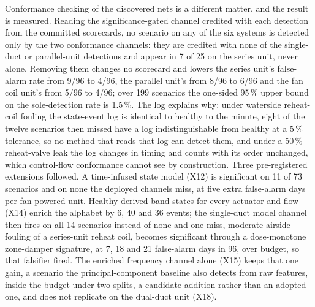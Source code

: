 \documentclass[11pt,letterpaper]{article}
\begin{document}
Conformance checking of the discovered nets is a different matter, and the result is measured. Reading the significance-gated channel credited with each detection from the committed scorecards, no scenario on any of the six systems is detected only by the two conformance channels: they are credited with none of the single-duct or parallel-unit detections and appear in 7 of 25 on the series unit, never alone. Removing them changes no scorecard and lowers the series unit's false-alarm rate from 9/96 to 4/96, the parallel unit's from 8/96 to 6/96 and the fan coil unit's from 5/96 to 4/96; over 199 scenarios the one-sided 95\,\% upper bound on the sole-detection rate is 1.5\,\%. The log explains why: under waterside reheat-coil fouling the state-event log is identical to healthy to the minute, eight of the twelve scenarios then missed have a log indistinguishable from healthy at a 5\,\% tolerance, so no method that reads that log can detect them, and under a 50\,\% reheat-valve leak the log changes in timing and counts with its order unchanged, which control-flow conformance cannot see by construction. Three pre-registered extensions followed. A time-infused state model (X12) is significant on 11 of 73 scenarios and on none the deployed channels miss, at five extra false-alarm days per fan-powered unit. Healthy-derived band states for every actuator and flow (X14) enrich the alphabet by 6, 40 and 36 events; the single-duct model channel then fires on all 14 scenarios instead of none and one miss, moderate airside fouling of a series-unit reheat coil, becomes significant through a dose-monotone zone-damper signature, at 7, 18 and 21 false-alarm days in 96, over budget, so that falsifier fired. The enriched frequency channel alone (X15) keeps that one gain, a scenario the principal-component baseline also detects from raw features, inside the budget under two splits, a candidate addition rather than an adopted one, and does not replicate on the dual-duct unit (X18).
\end{document}
